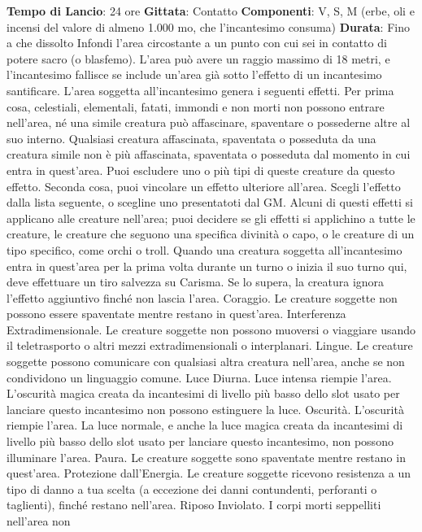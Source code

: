 \begin{multicols}{2}
\textbf{Tempo di Lancio}: 24 ore
\textbf{Gittata}: Contatto
\textbf{Componenti}: V, S, M (erbe, oli e incensi del valore di
almeno 1.000 mo, che l’incantesimo consuma)
\textbf{Durata}: Fino a che dissolto
Infondi l’area circostante a un punto con cui sei in
contatto di potere sacro (o blasfemo). L’area può avere
un raggio massimo di 18 metri, e l’incantesimo fallisce
se include un’area già sotto l’effetto di un incantesimo
santificare. L’area soggetta all’incantesimo genera i
seguenti effetti.
Per prima cosa, celestiali, elementali, fatati, immondi e
non morti non possono entrare nell’area, né una simile
creatura può affascinare, spaventare o possederne
altre al suo interno. Qualsiasi creatura affascinata,
spaventata o posseduta da una creatura simile non è
più affascinata, spaventata o posseduta dal momento in
cui entra in quest’area. Puoi escludere uno o più tipi di
queste creature da questo effetto.
Seconda cosa, puoi vincolare un effetto ulteriore
all’area. Scegli l’effetto dalla lista seguente, o scegline
uno presentatoti dal GM. Alcuni di questi effetti si
applicano alle creature nell’area; puoi decidere se gli
effetti si applichino a tutte le creature, le creature che
seguono una specifica divinità o capo, o le creature di
un tipo specifico, come orchi o troll. Quando una
creatura soggetta all’incantesimo entra in quest’area
per la prima volta durante un turno o inizia il suo turno
qui, deve effettuare un tiro salvezza su Carisma. Se lo
supera, la creatura ignora l’effetto aggiuntivo finché non
lascia l’area.
Coraggio. Le creature soggette non possono essere
spaventate mentre restano in quest’area.
Interferenza Extradimensionale. Le creature soggette
non possono muoversi o viaggiare usando il
teletrasporto o altri mezzi extradimensionali o
interplanari.
Lingue. Le creature soggette possono comunicare con
qualsiasi altra creatura nell’area, anche se non
condividono un linguaggio comune.
Luce Diurna. Luce intensa riempie l’area. L’oscurità
magica creata da incantesimi di livello più basso dello
slot usato per lanciare questo incantesimo non possono
estinguere la luce.
Oscurità. L’oscurità riempie l’area. La luce normale, e
anche la luce magica creata da incantesimi di livello più
basso dello slot usato per lanciare questo incantesimo,
non possono illuminare l’area.
Paura. Le creature soggette sono spaventate mentre
restano in quest’area.
Protezione dall’Energia. Le creature soggette
ricevono resistenza a un tipo di danno a tua scelta (a
eccezione dei danni contundenti, perforanti o taglienti),
finché restano nell’area.
Riposo Inviolato. I corpi morti seppelliti nell’area non

\end{multicols}
